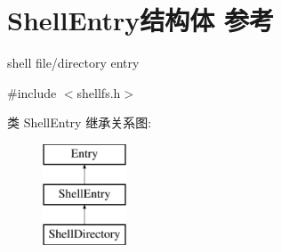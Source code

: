 \hypertarget{struct_shell_entry}{}\section{Shell\+Entry结构体 参考}
\label{struct_shell_entry}


shell file/directory entry  




{\ttfamily \#include $<$shellfs.\+h$>$}

类 Shell\+Entry 继承关系图\+:\begin{figure}[H]
\begin{center}
\leavevmode
\includegraphics[height=3.000000cm]{struct_shell_entry}
\end{center}
\end{figure}

